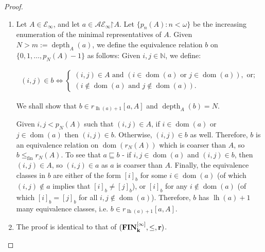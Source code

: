 \documentclass[10pt,a4paper]{amsart}
\newcommand{\E}{\cal{E}}
\newcommand{\FIN}{\bf{FIN}}
\newcommand{\N}{\mathbb{N}}
\newcommand{\cal}{\mathcal}
\newcommand{\depth}{\func{depth}}
\newcommand{\dom}{\func{dom}}
\newcommand{\fin}{\mathrm{fin}}
\newcommand{\func}{\operatorname}
\newcommand{\lh}{\func{lh}}
\newcommand{\restrictedto}{\mathord{\upharpoonright}}
\begin{document}
\begin{proof}
\begin{enumerate}
        \item Let $A \in \E_\infty$, and let $a \in \cal{AE}_\infty\restrictedto A$. Let $\{p_n(A) : n < \omega\}$ be the increasing enumeration of the minimal representatives of $A$. Given $N > m := \depth_A(a)$, we define the equivalence relation $b$ on $\{0,1,\dots,p_N(A)-1\}$ as follows: Given $i,j \in \N$, we define:
        \begin{small}
            \begin{gather*}
                (i,j) \in b \iff
                \begin{cases}
                    (i,j) \in A \text{ and } (i \in \dom(a) \text{ or } j \in \dom(a)), \text{ or}; \\
                    (i \notin \dom(a) \text{ and } j \notin \dom(a)).
                \end{cases}
            \end{gather*}
        \end{small}
        We shall show that $b \in r_{\lh(a)+1}[a,A]$ and $\depth_A(b) = N$.
        
        Given $i,j < p_N(A)$ such that $(i,j) \in A$, if $i \in \dom(a)$ or $j \in \dom(a)$ then $(i,j) \in b$. Otherwise, $(i,j) \in b$ as well. Therefore, $b$ is an equivalence relation on $\dom(r_N(A))$ which is coarser than $A$, so $b \leq_\fin r_N(A)$. To see that $a \sqsubseteq b$ - if $i,j \in \dom(a)$ and $(i,j) \in b$, then $(i,j) \in A$, so $(i,j) \in a$ as $a$ is coarser than $A$. Finally, the equivalence classes in $b$ are either of the form $[i]_b$ for some $i \in \dom(a)$ (of which $(i,j) \notin a$ implies that $[i]_b \neq [j]_b$), or $[i]_b$ for any $i \notin \dom(a)$ (of which $[i]_b = [j]_b$ for all $i,j \notin \dom(a)$). Therefore, $b$ has $\lh(a) + 1$ many equivalence classes, i.e. $b \in r_{\lh(a)+1}[a,A]$.

        \item The proof is identical to that of $(\FIN_k^{[\infty]},\leq,r)$.
    \end{enumerate}
\end{proof}
\end{document}
